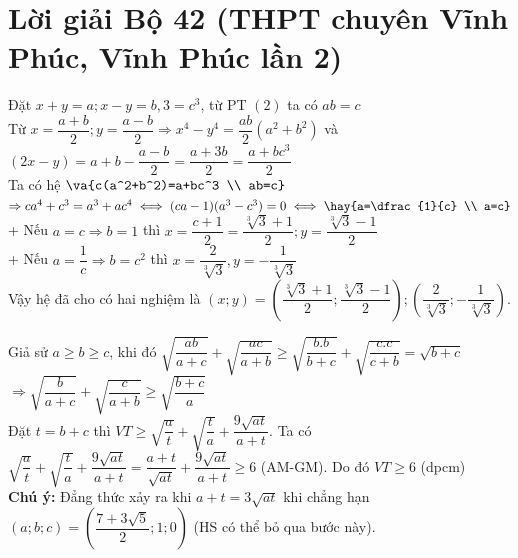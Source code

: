 \section{Lời giải Bộ 42 (THPT chuyên Vĩnh Phúc, Vĩnh Phúc lần 2)}

\lgi 
\vspace{5cm}

\hda 
Đặt $x+y=a;x-y=b,3=c^3$, từ PT $(2)$ ta có $ab=c$\\
Từ $x=\dfrac{a+b}{2};y=\dfrac{a-b}{2}\Rightarrow x^4-y^4=\dfrac{ab}{2}(a^2+b^2)$ và\\
$(2x-y)=a+b-\dfrac{a-b}{2}=\dfrac{a+3b}{2}=\dfrac{a+bc^3}{2}$\\
Ta có hệ $\va{c(a^2+b^2)=a+bc^3 \\ ab=c}$\\
$\Rightarrow ca^4+c^3=a^3+ac^4\\ 
\iff (ca-1)(a^3-c^3)=0\\
\iff \hay{a=\dfrac{1}{c} \\ a=c}$\\
+ Nếu $a=c\Rightarrow b=1$ thì $x=\dfrac{c+1}{2}=\dfrac{\sqrt[3]{3}+1}{2};y=\dfrac{\sqrt[3]{3}-1}{2}$\\
+ Nếu $a=\dfrac{1}{c}\Rightarrow b=c^2$ thì $x=\dfrac{2}{\sqrt[3]{3}},y=-\dfrac{1}{\sqrt[3]{3}}$\\
Vậy hệ đã cho có hai nghiệm là $(x;y)=\left(\dfrac{\sqrt[3]{3}+1}{2};\dfrac{\sqrt[3]{3}-1}{2}\right);\left(\dfrac{2}{\sqrt[3]{3}}; -\dfrac{1}{\sqrt[3]{3}}\right)$.

\hda 
Giả sử $a\ge b\ge c$, khi đó $\sqrt{\dfrac{ab}{a+c}}+\sqrt{\dfrac{ac}{a+b}}\ge \sqrt{\dfrac{b.b}{b+c}}+\sqrt{\dfrac{c.c}{c+b}}=\sqrt{b+c}$
$\Rightarrow \sqrt{\dfrac{b}{a+c}}+\sqrt{\dfrac{c}{a+b}}\ge \sqrt{\dfrac{b+c}{a}}$\\
Đặt $t=b+c$ thì $VT\ge \sqrt{\dfrac{a}{t}}+\sqrt{\dfrac{t}{a}}+\dfrac{9\sqrt{at}}{a+t}$.
Ta có $\sqrt{\dfrac{a}{t}}+\sqrt{\dfrac{t}{a}}+\dfrac{9\sqrt{at}}{a+t}=\dfrac{a+t}{\sqrt{at}}+\dfrac{9\sqrt{at}}{a+t}\ge 6$ (AM-GM).
Do đó $VT\ge 6$ (dpcm)\\
\textbf{Chú ý:} Đẳng thức xảy ra khi $a+t=3\sqrt{at}$ khi chẳng hạn $(a;b;c)=\left(\dfrac{7+3\sqrt{5}}{2};1;0\right)$ (HS có thể bỏ qua bước này).

